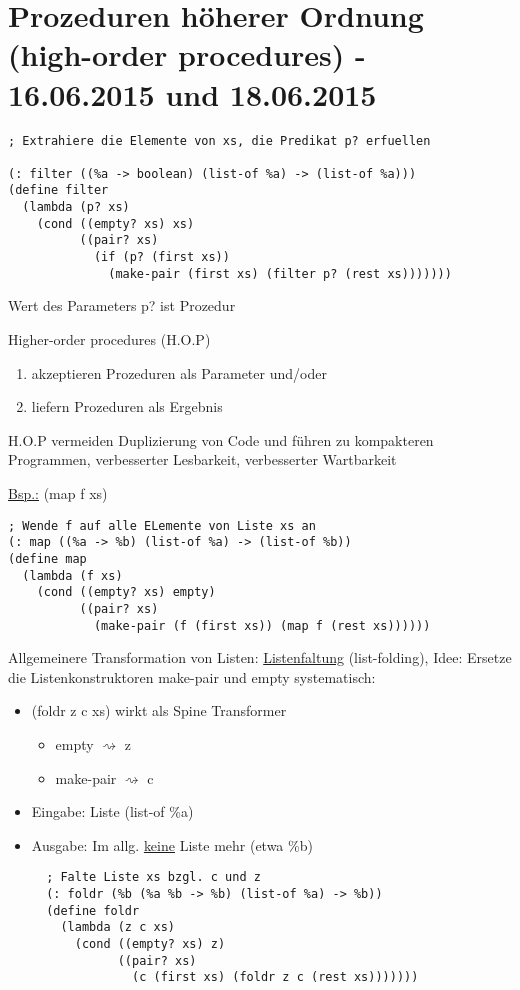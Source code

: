 \documentclass[a4paper, 20pt, openany]{book}
\begin{document}
\chapter{Prozeduren höherer Ordnung (high-order procedures) - 16.06.2015 und 18.06.2015}

\begin{lstlisting}
; Extrahiere die Elemente von xs, die Predikat p? erfuellen

(: filter ((%a -> boolean) (list-of %a) -> (list-of %a)))
(define filter
  (lambda (p? xs)
    (cond ((empty? xs) xs)
          ((pair? xs) 
            (if (p? (first xs))
              (make-pair (first xs) (filter p? (rest xs)))))))
\end{lstlisting}

Wert des Parameters p? ist Prozedur

Higher-order procedures (H.O.P) 

\begin{enumerate}[label=(\alph*)]
  \item akzeptieren Prozeduren als Parameter und/oder
  \item liefern Prozeduren als Ergebnis
\end{enumerate}

H.O.P vermeiden Duplizierung von Code und führen zu kompakteren Programmen, verbesserter Lesbarkeit, verbesserter Wartbarkeit

\underline{Bsp.:} (map f xs)

\begin{lstlisting}
; Wende f auf alle ELemente von Liste xs an
(: map ((%a -> %b) (list-of %a) -> (list-of %b))
(define map
  (lambda (f xs)
    (cond ((empty? xs) empty)
          ((pair? xs)
            (make-pair (f (first xs)) (map f (rest xs))))))
\end{lstlisting}

Allgemeinere Transformation von Listen: \underline{Listenfaltung} (list-folding), Idee: Ersetze die Listenkonstruktoren make-pair und empty systematisch:

\begin{itemize}
  \item (foldr z c xs) wirkt als Spine Transformer
    \begin{itemize}
      \item empty $\rightsquigarrow$ z
      \item make-pair $\rightsquigarrow$ c
    \end{itemize}
    
  \item Eingabe: Liste (list-of \%a)
  \item Ausgabe: Im allg. \underline{keine} Liste mehr (etwa \%b)
  
  \begin{lstlisting}
  ; Falte Liste xs bzgl. c und z
  (: foldr (%b (%a %b -> %b) (list-of %a) -> %b))
  (define foldr
    (lambda (z c xs)
      (cond ((empty? xs) z)
            ((pair? xs) 
              (c (first xs) (foldr z c (rest xs)))))))
   \end{lstlisting}
\end{itemize}
\end{document}
